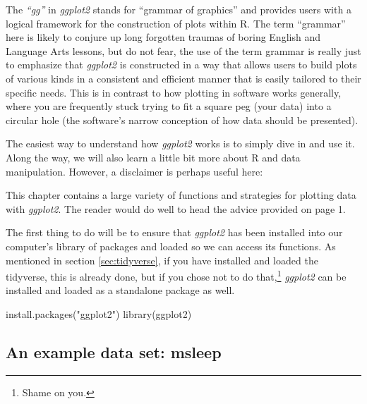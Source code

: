 The \textit{``gg''} in \textit{ggplot2} stands for ``grammar of graphics'' and provides users with a logical framework for the construction of plots within R.  The term ``grammar'' here is likely to conjure up long forgotten traumas of boring English and Language Arts lessons, but do not fear, the use of the term grammar is really just to emphasize that \textit{ggplot2} is constructed in a way that allows users to build plots of various kinds in a consistent and efficient manner that is easily tailored to their specific needs.  This is in contrast to how plotting in software works generally, where you are frequently stuck trying to fit a square peg (your data) into a circular hole (the software's narrow conception of how data should be presented).

The easiest way to understand how \textit{ggplot2} works is to simply dive in and use it. Along the way, we will also learn a little bit more about R and data manipulation. However, a disclaimer is perhaps useful here:

\begin{displayquote}
\headingfont
   This chapter contains a large variety of functions and strategies for plotting data with \textit{ggplot2}. The reader would do well to head the advice provided on page 1.
\end{displayquote}

The first thing to do will be to ensure that \textit{ggplot2} has been installed into our computer's library of packages and loaded so we can access its functions. As mentioned in section \ref{sec:tidyverse}, if you have installed and loaded the tidyverse, this is already done, but if you chose not to do that,\footnote{Shame on you.} \textit{ggplot2} can be installed and loaded as a standalone package as well.

\begin{inR}
install.packages("ggplot2")
library(ggplot2)
\end{inR}

\subsection{An example data set: msleep}


